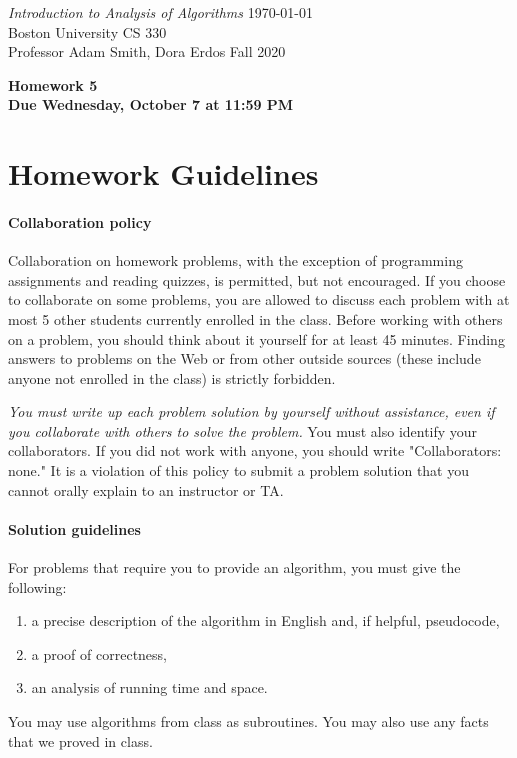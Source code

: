 \documentclass[letterpaper,11pt]{article}
\begin{document}
{\noindent\large
{\em Introduction to Analysis of Algorithms} \hfill \today\\
Boston University \hfill CS 330\\
Professor  Adam Smith, Dora Erdos \hfill Fall 2020\\}
\vspace{1pt}
\hrulefill\vspace{3mm}
\begin{center}
{\LARGE\bf Homework 5}\\
{\bf Due Wednesday, October 7 at 11:59 PM}
\end{center}
\section*{Homework Guidelines}

\paragraph{Collaboration policy} Collaboration on homework problems, with the exception of
programming assignments and reading quizzes, is permitted, but not encouraged.
If you
choose to collaborate on some problems, you are allowed to discuss
each problem with at most 5 other students currently enrolled in the
class.
Before working with others on a problem, you should think about it
yourself for at least 45 minutes. Finding answers to problems on the
Web or from other outside sources (these include anyone not enrolled
in the class) is strictly forbidden.

{\em You must write up each problem solution by yourself without
assistance, even if you collaborate with others to solve the
problem.} You must also identify your collaborators. If you did not
work with anyone, you should write "Collaborators: none." It is a
violation of this policy to submit a problem solution that you
cannot orally explain to an instructor or TA.

\paragraph{Solution guidelines} For problems that require you to provide an algorithm, you must give the following:
    \begin{enumerate}
\item  a precise description of the algorithm in English and, if helpful, pseudocode,
\item a proof of correctness,
\item an analysis of running time and space.
\end{enumerate}
You may use algorithms from class as subroutines. You may also use any facts that we proved in class.
\end{document}
